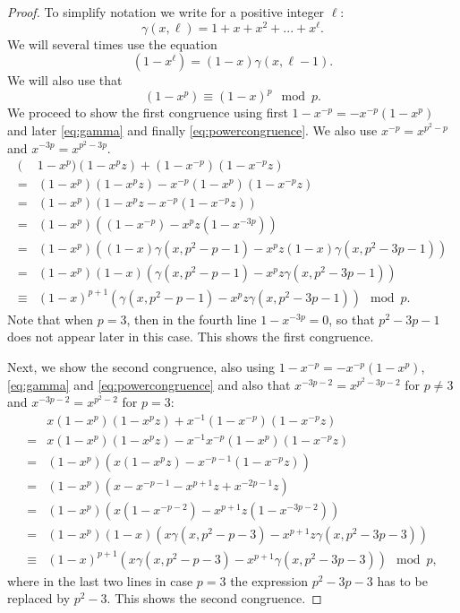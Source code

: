 \documentclass[a4paper,10pt]{amsart}
\theoremstyle{definition}
\theoremstyle{remark}
\begin{document}
\begin{proof}
To simplify notation we write for a positive integer $\ell$:
\[\gamma(x,\ell) = 1 + x + x^{2} + ... + x^{\ell}.\]
We will several times use the equation 
\begin{equation}\label{eq:gamma}
(1-x^{\ell}) = (1-x)\gamma(x, \ell-1).
\end{equation}
We will also use that 
\begin{equation}\label{eq:powercongruence}
(1-x^p) \equiv (1-x)^p \mod p.
\end{equation}
We proceed to show the first congruence using first $1-x^{-p} = -x^{-p}(1-x^p)$ and later \eqref{eq:gamma} and finally \eqref{eq:powercongruence}. We also use $x^{-p} = x^{p^2-p}$ and $x^{-3p} = x^{p^2-3p}$.
\begin{align*}
(&1-x^p)(1-x^p z) + (1-x^{-p})(1-x^{-p} z) \\
=& (1-x^p)(1-x^p z) - x^{-p}(1-x^p)(1-x^{-p} z) \\
=& (1-x^p)(1-x^p z - x^{-p}(1-x^{-p} z)) \\
=& (1-x^p)((1-x^{-p}) - x^p z (1-x^{-3p})) \\
=& (1-x^p)((1-x)\gamma(x, p^2-p-1) - x^p z(1-x)\gamma(x, p^2-3p-1)) \\
=& (1-x^p)(1-x) (\gamma(x, p^2-p-1) - x^p z\gamma(x, p^2-3p-1)) \\
\equiv & (1-x)^{p+1}(\gamma(x, p^2-p-1) - x^p z \gamma(x, p^2-3p-1)) \mod p.
\end{align*}
Note that when $p=3$, then in the fourth line $1-x^{-3p} = 0$, so that $p^2-3p-1$ does not appear later in this case. This shows the first congruence.

Next, we show the second congruence, also using $1-x^{-p} = -x^{-p}(1-x^p)$, \eqref{eq:gamma} and \eqref{eq:powercongruence}  and also that $x^{-3p-2} = x^{p^2-3p-2}$ for $p \neq 3$ and $x^{-3p-2} = x^{p^2-2}$ for $p=3$:
\begin{align*}
& x(1-x^p)(1-x^p z) + x^{-1}(1-x^{-p})(1-x^{-p} z) \\
=& x(1-x^p)(1-x^p z) - x^{-1}x^{-p}(1-x^p)(1-x^{-p} z) \\
=& (1-x^p)(x(1-x^p z) - x^{-p-1} (1-x^{-p} z)) \\
=& (1-x^p)(x - x^{-p-1} - x^{p + 1}z + x^{-2p-1} z) \\
=& (1-x^p)(x(1-x^{-p-2}) - x^{p + 1} z(1-x^{-3p-2})) \\
=& (1-x^p)(1-x)(x\gamma(x, p^2-p-3) - x^{p + 1} z\gamma(x, p^2-3p-3)) \\
\equiv& (1-x)^{p+1}(x\gamma(x, p^2-p-3) - x^{p + 1}\gamma(x, p^2-3p-3)) \mod p,
\end{align*}
where in the last two lines in case $p=3$ the expression $p^2-3p-3$ has to be replaced by $p^2-3$. This shows the second congruence.
\end{proof}
\end{document}
